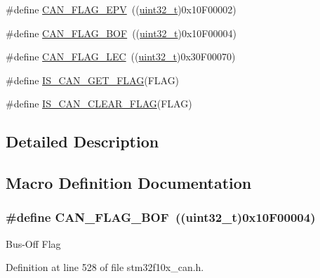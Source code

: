 \begin{DoxyCompactItemize}
\#define \hyperlink{group___c_a_n__flags_ga61954e54995f638ed78281ad2b0cf43a}{C\+A\+N\+\_\+\+F\+L\+A\+G\+\_\+\+E\+PV}~((\hyperlink{_p_e___types_8h_a33594304e786b158f3fb30289278f5af}{uint32\+\_\+t})0x10\+F00002)
\item 
\#define \hyperlink{group___c_a_n__flags_ga65f20612d0bf1692003882c0cdbadb1c}{C\+A\+N\+\_\+\+F\+L\+A\+G\+\_\+\+B\+OF}~((\hyperlink{_p_e___types_8h_a33594304e786b158f3fb30289278f5af}{uint32\+\_\+t})0x10\+F00004)
\item 
\#define \hyperlink{group___c_a_n__flags_ga73a774fa4d391aec0ea6552bf9372917}{C\+A\+N\+\_\+\+F\+L\+A\+G\+\_\+\+L\+EC}~((\hyperlink{_p_e___types_8h_a33594304e786b158f3fb30289278f5af}{uint32\+\_\+t})0x30\+F00070)
\item 
\#define \hyperlink{group___c_a_n__flags_ga38d33d1762ed3a331d214cdb3249866e}{I\+S\+\_\+\+C\+A\+N\+\_\+\+G\+E\+T\+\_\+\+F\+L\+AG}(F\+L\+AG)
\item 
\#define \hyperlink{group___c_a_n__flags_gac46f5fb953efb6163cf3b2e33a514d0c}{I\+S\+\_\+\+C\+A\+N\+\_\+\+C\+L\+E\+A\+R\+\_\+\+F\+L\+AG}(F\+L\+AG)
\end{DoxyCompactItemize}


\subsection{Detailed Description}


\subsection{Macro Definition Documentation}
\subsubsection[{\texorpdfstring{C\+A\+N\+\_\+\+F\+L\+A\+G\+\_\+\+B\+OF}{CAN_FLAG_BOF}}]{\setlength{\rightskip}{0pt plus 5cm}\#define C\+A\+N\+\_\+\+F\+L\+A\+G\+\_\+\+B\+OF~(({\bf uint32\+\_\+t})0x10\+F00004)}\hypertarget{group___c_a_n__flags_ga65f20612d0bf1692003882c0cdbadb1c}{}\label{group___c_a_n__flags_ga65f20612d0bf1692003882c0cdbadb1c}
Bus-\/\+Off Flag 

Definition at line 528 of file stm32f10x\+\_\+can.\+h.

